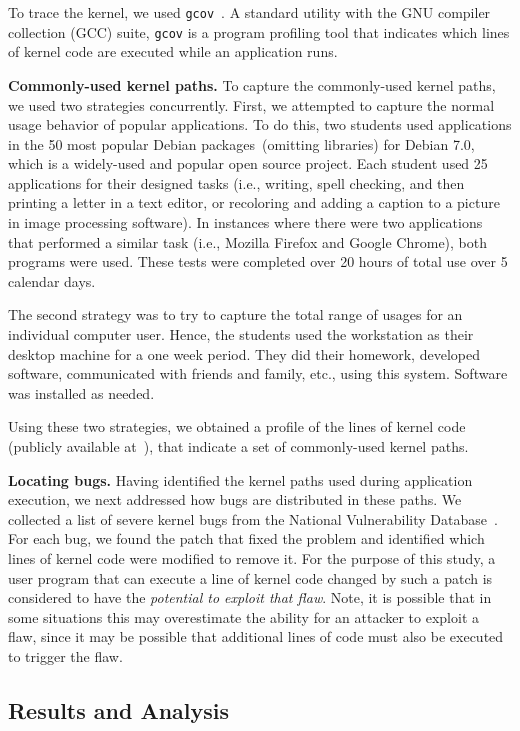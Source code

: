 To trace the kernel, we used \texttt{gcov}~\cite{gcov}. A standard utility with
the GNU compiler collection (GCC) suite,
\texttt{gcov} is a program profiling tool that indicates which lines of kernel
code are executed while an application runs. 

\textbf{Commonly-used kernel paths.}
To capture the commonly-used kernel paths, we used two strategies concurrently.
First, we attempted to capture the normal usage behavior of popular applications.
To do this, two students used applications in the 50 most popular Debian
packages~\cite{Top-Packages}(omitting libraries) for Debian 7.0, which is a widely-used and 
popular open source project. 
Each student used 25 applications for their designed
tasks (i.e., writing, spell checking, and then printing a letter in a text
editor, or recoloring and adding a caption to a picture in image processing
software). In instances where there were two applications that performed a
similar task (i.e., Mozilla Firefox and Google Chrome), both programs were
used. These tests were completed over 20 hours of
total use over 5 calendar days. 

The second strategy was to try to capture the total range of usages for an
individual computer user. Hence, the students used the workstation as their
desktop machine for a one week period. They did their homework, developed
software, communicated with friends and family, etc., using this system.
Software was installed as needed.

Using these two strategies, we obtained a profile of the lines of
kernel code (publicly available at~\cite{Lind}), that indicate
a set of commonly-used kernel paths.

\textbf{Locating bugs.}
Having identified the kernel paths used during application execution, we next
addressed how bugs are distributed in these paths. We collected a list of
severe kernel bugs from the National Vulnerability Database~\cite{NVD}. 
For each bug, we found the patch that fixed the problem and identified
which lines of kernel code were modified to remove it.
For the purpose of this study, a user program that can execute a line of kernel
code changed by such a patch is considered to have the \textit{potential to
exploit that flaw}.  Note, it is possible that in some situations this may
overestimate the ability for an attacker to exploit a flaw, since it may be
possible that additional lines of code must also be executed to trigger the flaw.


\subsection{Results and Analysis}
\label{Verification-of-Hypothesis}

